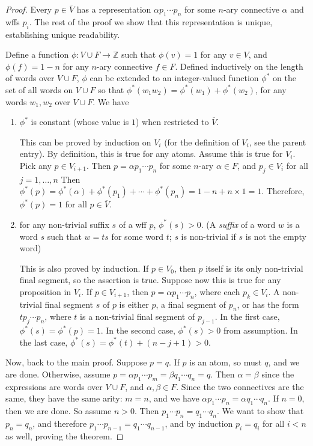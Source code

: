\documentclass[12pt]{article}
\begin{document}
\begin{proof}
Every $p\in \overline{V}$ has a representation $\alpha p_1 \cdots p_n$ for some $n$-ary connective $\alpha$ and wffs $p_i$.  The rest of the proof we show that this representation is unique, establishing unique readability.

Define a function $\phi: V\cup F \to \mathbb{Z}$ such that $\phi(v)=1$ for any $v\in V$, and $\phi(f)=1-n$ for any $n$-ary connective $f\in F$.  Defined inductively on the length of words over $V\cup F$, $\phi$ can be extended to an integer-valued function $\phi^*$ on the set of all words on $V\cup F$ so that $\phi^*(w_1w_2)=\phi^*(w_1)+\phi^*(w_2)$, for any words $w_1,w_2$ over $V\cup F$.  We have
\begin{enumerate}
\item $\phi^*$ is constant (whose value is $1$) when restricted to $\overline{V}$.

This can be proved by induction on $V_i$ (for the definition of $V_i$, see the parent entry).  By definition, this is true for any atoms.  Assume this is true for $V_i$.  Pick any $p\in V_{i+1}$.  Then $p=\alpha p_1 \cdots p_n$ for some $n$-ary $\alpha \in F$, and $p_j\in V_i$ for all $j=1,\ldots, n$  Then $\phi^*(p)= \phi^*(\alpha) + \phi^*(p_1) + \cdots + \phi^*(p_n) = 1 - n + n\times 1 = 1$.  Therefore, $\phi^*(p)=1$ for all $p\in \overline{V}$.
\item for any non-trivial suffix $s$ of a wff $p$, $\phi^*(s)>0$.  (A \emph{suffix} of a word $w$ is a word $s$ such that $w=ts$ for some word $t$; $s$ is non-trivial if $s$ is not the empty word) 

This is also proved by induction.  If $p\in V_0$, then $p$ itself is its only non-trivial final segment, so the assertion is true.  Suppose now this is true for any proposition in $V_i$.  If $p \in V_{i+1}$, then $p=\alpha p_1 \cdots p_n$, where each $p_k\in V_i$.  A non-trivial final segment $s$ of $p$ is either $p$, a final segment of $p_n$, or has the form $tp_j \cdots p_n$, where $t$ is a non-trivial final segment of $p_{j-1}$.  In the first case, $\phi^*(s)=\phi^*(p)=1$.  In the second case, $\phi^*(s)>0$ from assumption.  In the last case, $\phi^*(s)=\phi^*(t)+(n-j+1)>0$.
\end{enumerate}
Now, back to the main proof.  Suppose $p=q$.  If $p$ is an atom, so must $q$, and we are done.  Otherwise, assume $p = \alpha p_1 \cdots p_m = \beta q_1 \cdots q_n = q$.  Then $\alpha = \beta$ since the expressions are words over $V\cup F$, and $\alpha ,\beta\in F$.  Since the two connectives are the same, they have the same arity: $m=n$, and we have $\alpha p_1 \cdots p_n = \alpha q_1 \cdots q_n$.  If $n=0$, then we are done.  So assume $n>0$.  Then $p_1\cdots p_n = q_1 \cdots q_n$.  We want to show that $p_n=q_n$, and therefore $p_1 \cdots p_{n-1} = q_1 \cdots q_{n-1}$, and by induction $p_i = q_i$ for all $i< n$ as well, proving the theorem.


\end{proof}
\end{document}
